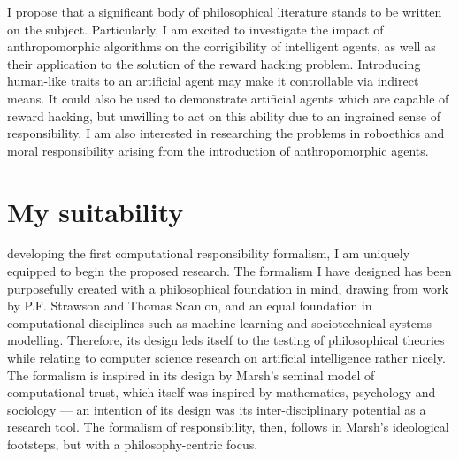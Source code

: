 I propose that a significant body of philosophical literature stands to be written on the subject. Particularly, I am excited to investigate the impact of anthropomorphic algorithms on the corrigibility of intelligent agents, as well as their application to the solution of the reward hacking problem. Introducing human-like traits to an artificial agent may make it controllable via indirect means. It could also be used to demonstrate artificial agents which are capable of reward hacking, but unwilling to act on this ability due to an ingrained sense of responsibility. I am also interested in researching the problems in roboethics and moral responsibility arising from the introduction of anthropomorphic agents.\par

\section{My suitability}

 developing the first computational responsibility formalism, I am uniquely equipped to begin the proposed research. The formalism I have designed has been purposefully created with a philosophical foundation in mind, drawing from work by P.F. Strawson\cite{freedomandresentment} and Thomas Scanlon\cite{scanlon2006justice}, and an equal foundation in computational disciplines such as machine learning and sociotechnical systems modelling\cite{sommerville_resp_depend}. Therefore, its design leds itself to the testing of philosophical theories while relating to computer science research on artificial intelligence rather nicely. The formalism is inspired in its design by Marsh's seminal model of computational trust\cite{marsh1994}, which itself was inspired by mathematics, psychology and sociology --- an intention of its design was its inter-disciplinary potential as a research tool. The formalism of responsibility, then, follows in Marsh's ideological footsteps, but with a philosophy-centric focus.\par


